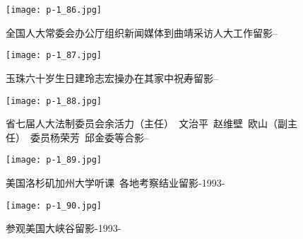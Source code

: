 \clearpage


\begin{figure}
    \begin{center}
        \texttt{[image: p-1\_86.jpg]}
        \begin{shaded}
            \caption{全国人大常委会办公厅组织新闻媒体到曲靖采访人大工作留影--}
        \end{shaded}
    \end{center}
\end{figure}

\clearpage


\begin{figure}
    \begin{center}
        \texttt{[image: p-1\_87.jpg]}
        \begin{shaded}
            \caption{玉珠六十岁生日建玲志宏操办在其家中祝寿留影--}
        \end{shaded}
    \end{center}
\end{figure}

\clearpage


\begin{figure}
    \begin{center}
        \texttt{[image: p-1\_88.jpg]}
        \begin{shaded}
            \caption{省七届人大法制委员会余活力（主任）~文治平~赵维壁~欧山（副主任）~委员杨荣芳~邱金委等合影--}
        \end{shaded}
    \end{center}
\end{figure}

\clearpage


\begin{figure}
    \begin{center}
        \texttt{[image: p-1\_89.jpg]}
        \begin{shaded}
            \caption{美国洛杉矶加州大学听课~各地考察结业留影-1993-}
        \end{shaded}
    \end{center}
\end{figure}

\clearpage


\begin{figure}
    \begin{center}
        \texttt{[image: p-1\_90.jpg]}
        \begin{shaded}
            \caption{参观美国大峡谷留影-1993-}
        \end{shaded}
    \end{center}
\end{figure}

